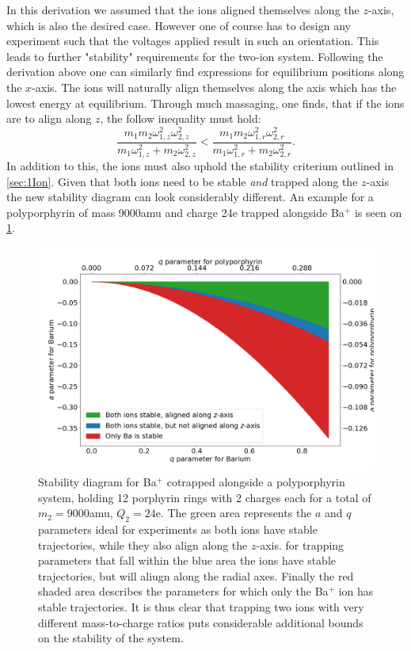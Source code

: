 In this derivation we assumed that the ions aligned themselves along the $z$-axis, which is also the desired case. However one of course has to design any experiment such that the voltages applied result in such an orientation. This leads to further "stability" requirements for the two-ion system.
Following the derivation above one can similarly find expressions for equilibrium positions along the $x$-axis. The ions will naturally align themselves along the axis which has the lowest energy at equilibrium. Through much massaging, one finds, that if the ions are to align along $z$, the follow inequality must hold:
\begin{equation}
    \frac{m_1m_2\omega_{1,z}^2\omega_{2,z}^2}{m_1\omega_{1,z}^2+m_2\omega_{2,z}^2} < \frac{m_1m_2\omega_{1,r}^2\omega_{2,r}^2}{m_1\omega_{1,r}^2+m_2\omega_{2,r}^2}.
\end{equation}
In addition to this, the ions must also uphold the stability criterium outlined in \cref{sec:1Ion}. Given that both ions need to be stable \textit{and} trapped along the $z$-axis the new stability diagram can look considerably different. An example for a polyporphyrin of mass 9000amu and charge 24e trapped alongside Ba$^+$ is seen on \cref{fig:Stability2}.
\begin{figure}
    \centering
    \includegraphics[width = \textwidth]{main/Stability2.png}
    \caption{Stability diagram for Ba$^+$ cotrapped alongside a polyporphyrin system, holding 12 porphyrin rings with 2 charges each for a total of $m_2 = 9000$amu, $Q_2 = 24$e. The green area represents the $a$ and $q$ parameters ideal for experiments as both ions have stable trajectories, while they also align along the $z$-axis.
    for trapping parameters that fall within the blue area the ions have stable trajectories, but will aliugn along the radial axes. Finally the red shaded area describes the parameters for which only the Ba$^+$ ion has stable trajectories. It is thus clear that trapping two ions with very different mass-to-charge ratios puts considerable additional bounds on the stability of the system.}
    \label{fig:Stability2}
\end{figure}


